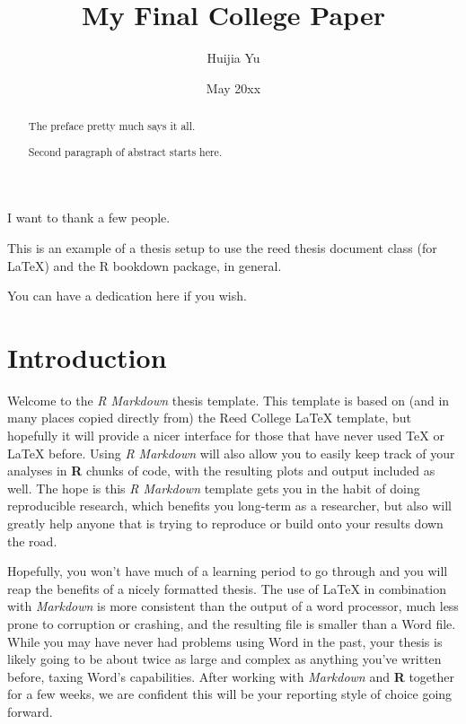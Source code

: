 \documentclass[12pt,twoside]{dukestatscithesis}
\title{My Final College Paper}
\author{Huijia Yu}
\date{May 20xx}
\theoremstyle{definition}
\theoremstyle{definition}
\theoremstyle{definition}
\theoremstyle{remark}
\begin{document}
  \maketitle

\frontmatter %
\pagestyle{empty} %
  \begin{acknowledgements}
    I want to thank a few people.
  \end{acknowledgements}
  \begin{preface}
    This is an example of a thesis setup to use the reed thesis document
    class (for LaTeX) and the R bookdown package, in general.
  \end{preface}
  \hypersetup{linkcolor=black}
  \setcounter{tocdepth}{2}
  \tableofcontents

  \listoftables

  \listoffigures
  \begin{abstract}
    The preface pretty much says it all. \par
    
    Second paragraph of abstract starts here.
  \end{abstract}
  \begin{dedication}
    You can have a dedication here if you wish.
  \end{dedication}
\mainmatter %
\pagestyle{fancyplain} %

\chapter*{Introduction}\label{introduction}

Welcome to the \emph{R Markdown} thesis template. This template is based
on (and in many places copied directly from) the Reed College LaTeX
template, but hopefully it will provide a nicer interface for those that
have never used TeX or LaTeX before. Using \emph{R Markdown} will also
allow you to easily keep track of your analyses in \textbf{R} chunks of
code, with the resulting plots and output included as well. The hope is
this \emph{R Markdown} template gets you in the habit of doing
reproducible research, which benefits you long-term as a researcher, but
also will greatly help anyone that is trying to reproduce or build onto
your results down the road.

Hopefully, you won't have much of a learning period to go through and
you will reap the benefits of a nicely formatted thesis. The use of
LaTeX in combination with \emph{Markdown} is more consistent than the
output of a word processor, much less prone to corruption or crashing,
and the resulting file is smaller than a Word file. While you may have
never had problems using Word in the past, your thesis is likely going
to be about twice as large and complex as anything you've written
before, taxing Word's capabilities. After working with \emph{Markdown}
and \textbf{R} together for a few weeks, we are confident this will be
your reporting style of choice going forward.
\end{document}
